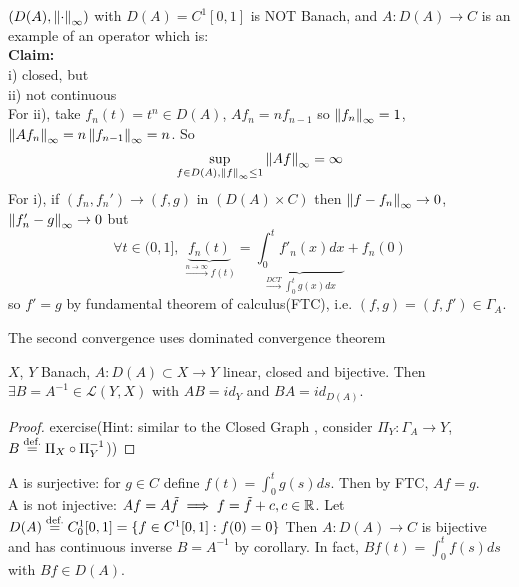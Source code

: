\documentclass{article}
\begin{document}
\begin{example}\nl
	$(D(A),\left\|{\cdot}\right\|_\infty)$ with $D(A)=C^1[0,1]$ is NOT Banach, and $A:D(A)\to C$ is an example of an operator which is:\\
	\textbf{Claim: }\\
	i) closed, but\\
	ii) not continuous\\
	For ii), take $f_n(t)=t^n\in D(A)$, $Af_n=nf_{n-1}$ so $\left\|{f_n}\right\|_\infty=1$, $\left\|{Af_n}\right\|_\infty=n\left\|{f_{n-1}}\right\|_\infty=n$. So 
	$$ \sup_{f\in D(A),\left\|{f}\right\|_\infty\leq1}\left\|{Af}\right\|_\infty=\infty$$
	For i), if $(f_n,f_n')\to(f,g)$ in $(D(A)\times C)$ then $\left\|{f-f_n}\right\|_\infty\to 0$, $\left\|{f_n'-g}\right\|_\infty\to0$ but
	$$
	\forall t\in(0,1],\,\underbrace{f_n(t)}_{\overset{n\to\infty}{\longrightarrow}f(t)}
	=\underbrace{\int_0^t f'_n(x) dx}_{\overset{DCT}{\longrightarrow}\int_0^t g(x) dx}
	+f_n(0)
	$$
	so $f'=g$ by fundamental theorem of calculus(FTC), i.e. $(f,g)=(f,f')\in\Gamma_A$. 
 \begin{unexaminable}
The second convergence uses dominated convergence theorem
 \end{unexaminable}
\end{example}


\begin{corollary}\nl
	$X$, $Y$ Banach, $A:D(A)\subset X\to Y$ linear, closed and bijective. Then $\exists B=A^{-1}\in\mathcal{L}(Y,X)$ with $AB=id_Y$ and $BA=id_{D(A)}$. 
\end{corollary}
\begin{proof}
    exercise(Hint: similar to the Closed Graph , consider $\Pi_Y:\Gamma_A\to Y$, $B\stackrel{\text{def.}}{=}\Pi_X\circ \Pi_Y^{-1}$))
\end{proof}

\begin{example}\nl
	A is surjective: for $g\in C$ define $f(t)=\int_0^t g(s) ds$. Then by FTC, $Af=g$.\\
	A is not injective: $Af=A\tilde{f}\implies f=\tilde{f}+c,c\in\mathbb{R}$. 
	Let $D(A)\stackrel{\text{def.}}{=} C_0^1[0,1]=\{f\in C^1[0,1]:f(0)=0\}$
	Then $A:D(A)\to C$ is bijective and has continuous inverse $B=A^{-1}$ by corollary. In fact, $Bf(t)=\int_0^tf(s)ds$ with $Bf\in D(A)$.
\end{example}
\end{document}
